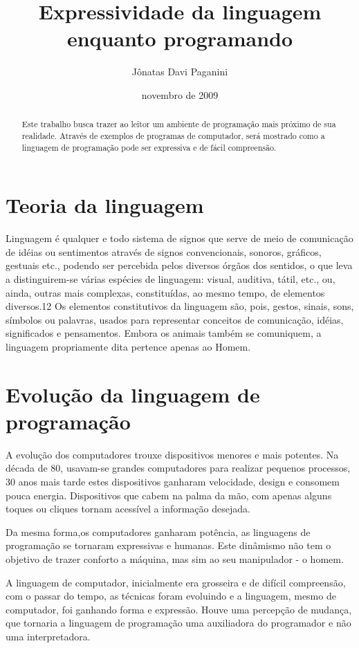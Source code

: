 \documentclass[12pt]{article}
\title{Expressividade da linguagem enquanto programando}
\author{Jônatas Davi Paganini}
\date{novembro de 2009}
\begin{document}
\maketitle
\begin{abstract}
Este trabalho busca trazer ao leitor um ambiente de programação mais próximo de sua realidade. Através de exemplos de programas de computador, será mostrado como a linguagem de programação pode ser expressiva e de fácil compreensão.
\end{abstract}

\tableofcontents

\section{Teoria da linguagem}

Linguagem é qualquer e todo sistema de signos que serve de meio de comunicação de idéias ou sentimentos através de signos convencionais, sonoros, gráficos, gestuais etc., podendo ser percebida pelos diversos órgãos dos sentidos, o que leva a distinguirem-se várias espécies de linguagem: visual, auditiva, tátil, etc., ou, ainda, outras mais complexas, constituídas, ao mesmo tempo, de elementos diversos.12 Os elementos constitutivos da linguagem são, pois, gestos, sinais, sons, símbolos ou palavras, usados para representar conceitos de comunicação, idéias, significados e pensamentos. Embora os animais também se comuniquem, a linguagem propriamente dita pertence apenas ao Homem.

\cite{wikiLinguagem}

\section{Evolução da linguagem de programação}

A evolução dos computadores trouxe dispositivos menores e mais potentes. Na década de 80, usavam-se grandes computadores para realizar pequenos processos, 30 anos mais tarde estes dispositivos ganharam velocidade, design e consomem pouca energia. Dispositivos que cabem na palma da mão, com apenas alguns toques ou cliques tornam acessível a informação desejada. 

Da mesma forma,os computadores ganharam potência, as linguagens de programação se tornaram expressivas e humanas. Este dinâmismo não tem o objetivo de trazer conforto a máquina, mas sim ao seu manipulador - o homem. 

A linguagem de computador, inicialmente era grosseira e de difícil compreensão, com o passar do tempo, as técnicas foram evoluindo e a linguagem, mesmo de computador, foi ganhando forma e expressão. Houve uma percepção de mudança, que tornaria a linguagem de programação uma auxiliadora do programador e não uma interpretadora.
\end{document}

